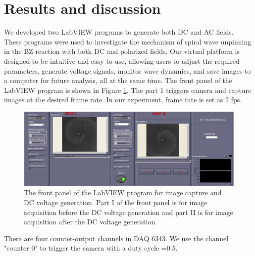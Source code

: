 \documentclass[journal=jacsat,manuscript=article]{achemso}
\begin{document}
\section{Results and discussion}
We developed two LabVIEW programs to generate both DC and AC
fields. These programs were used to investigate the mechanism of
spiral wave unpinning in the BZ reaction with both DC and polarized
fields.  Our virtual platform is designed to be
intuitive and easy to use, allowing users to adjust the required
parameters, generate voltage signals, monitor wave dynamics, and save
images to a computer for future analysis, all at the same time.
The front panel of the LabVIEW program is shown in Figure
\ref{fig:ex3}.
The part 1 triggers camera and capture images at the desired frame rate.
In our experiment, frame rate is set as 2 fps. 
\begin{figure}[H]
    \centering
\includegraphics[width=\linewidth,height=0.6\linewidth]{Dc_frntpnl - Copy.png}
    \caption{The front panel of the LabVIEW program for image capture
      and DC voltage generation. Part I of the front panel is for
      image acquisition before the DC voltage generation and part II
      is for image acquisition after the DC voltage generation}
    \label{fig:ex3}
\end{figure}

 There are four counter-output channels in DAQ 6343. We use the channel "counter 0" to trigger the camera with a duty cycle =0.5.
\end{document}
